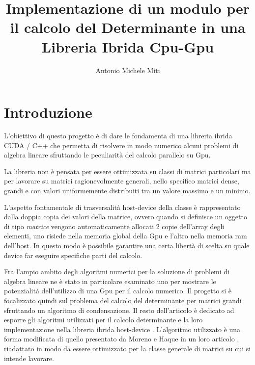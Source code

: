 \documentclass{article}
\title{Implementazione di un modulo per il calcolo del Determinante in una Libreria Ibrida Cpu-Gpu}
\author{Antonio Michele Miti}
\begin{document}
\maketitle

\section{Introduzione }
L'obiettivo di questo progetto è di dare le fondamenta di una libreria ibrida CUDA / C++ che permetta di risolvere in modo numerico alcuni problemi di algebra lineare sfruttando le peculiarità del calcolo parallelo su Gpu.

La libreria non è pensata per essere ottimizzata su classi di matrici particolari ma per lavorare su matrici ragionevolmente generali, nello specifico matrici dense, grandi e con valori uniformemente distribuiti tra un valore massimo e un minimo.

L'aspetto fontamentale di trasversalità host-device della classe è rappresentato dalla doppia copia dei valori della matrice, ovvero quando si definisce un oggetto di tipo \emph{matrice} vengono automaticamente allocati 2 copie dell'array degli elementi, uno risiede nella memoria global della Gpu e l'altro nella memoria ram dell'host. 
In questo modo è possibile garantire una certa libertà di scelta su quale device  far eseguire specifiche parti del calcolo.

Fra l'ampio ambito degli algoritmi numerici per la soluzione di problemi di algebra lineare ne è stato in particolare esaminato uno per mostrare le potenzialità dell'utilizzo di una Gpu per il calcolo numerico.
Il progetto si è focalizzato quindi sul problema del calcolo del determinante per matrici grandi sfruttando un algoritmo di condensazione.
Il resto dell'articolo è  dedicato ad esporre gli algoritmi utilizzati  per il calcolo determinante e la loro implementazione nella libreria ibrida host-device . 
L'algoritmo utilizzato è una forma modificata di quello presentato da Moreno e Haque in un loro articolo \cite{arx:MorenoHaque}, riadattato in modo da essere ottimizzato per la classe generale di matrici su cui si intende lavorare. 
\end{document}
